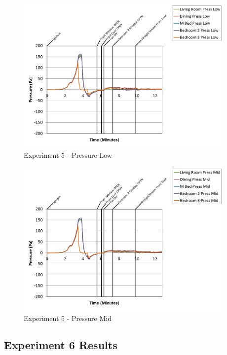 \documentclass{article}
\begin{document}
\begin{appendices}
\begin{figure}[h!]
	\centering
	\includegraphics[height=3.05in]{0_Images/Results_Charts/Exp_5_Charts/PressureLow.png}
	\caption{Experiment 5 - Pressure Low}
\end{figure}

\clearpage

\begin{figure}[h!]
	\centering
	\includegraphics[height=3.05in]{0_Images/Results_Charts/Exp_5_Charts/PressureMid.png}
	\caption{Experiment 5 - Pressure Mid}
\end{figure}


\clearpage
\clearpage		\large
\subsection{Experiment 6 Results} \label{App:Exp6Results} 


\end{appendices}
\end{document}
